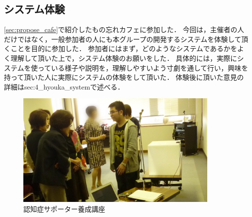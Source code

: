\documentclass[../report]{subfiles}
\begin{document}
\subsection{システム体験}
\ref{sec:propose_cafe}で紹介したもの忘れカフェに参加した．
今回は，主催者の人だけではなく，一般参加者の人にも本グループの開発するシステムを体験して頂くことを目的に参加した．
参加者にはまず，どのようなシステムであるかをよく理解して頂いた上で，システム体験のお願いをした．
具体的には，実際にシステムを使っている様子や説明を，理解しやすいよう寸劇を通して行い，興味を持って頂いた人に実際にシステムの体験をして頂いた．
体験後に頂いた意見の詳細は{sec:4_hyouka_system}で述べる．
\begin{figure}[htbp]
    \begin{center}
        \includegraphics[width=10cm]{imgs/2_system_taiken.jpg}
        \caption{認知症サポーター養成講座}
    \end{center}
\end{figure}
\end{document}
